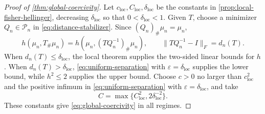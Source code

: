 \begin{proof}[Proof of \cref{thm:global-coercivity}]
Let \(c_{\mathrm{loc}},C_{\mathrm{loc}},\delta_{\mathrm{loc}}\) be the
constants in \cref{prop:local-fisher-hellinger}, decreasing
\(\delta_{\mathrm{loc}}\) so that \(0<\delta_{\mathrm{loc}}<1\).
Given \(T\), choose a minimizer
\(Q_n\in\mathcal P_n\) in \eqref{eq:distance-stabilizer}.  Since
\((Q_n)_\#\mu_n=\mu_n\),
\[
 h(\mu_n,T_\#\mu_n)
 =h(\mu_n,(TQ_n^{-1})_\#\mu_n),
 \qquad
 \|TQ_n^{-1}-I\|_F=d_n(T).
\]
When \(d_n(T)\le\delta_{\mathrm{loc}}\), the local theorem supplies the
two-sided linear bounds for \(h\).  When
\(d_n(T)>\delta_{\mathrm{loc}}\),
\eqref{eq:uniform-separation} with
\(\varepsilon=\delta_{\mathrm{loc}}\) supplies the lower bound, while
\(h^2\le2\) supplies the upper bound.  Choose $c>0$ no larger than
$c_{\mathrm{loc}}^2$ and
the positive infimum in \eqref{eq:uniform-separation} with
$\varepsilon=\delta_{\mathrm{loc}}$, and take
\[
 C=\max\{C_{\mathrm{loc}}^2,2\delta_{\mathrm{loc}}^{-2}\}.
\]
These constants give \eqref{eq:global-coercivity} in all regimes.
\end{proof}
